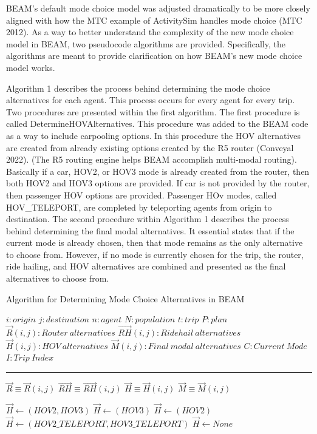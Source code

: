 \documentclass[12pt, oneside, openright]{byuthesis}
\begin{document}
BEAM's default mode choice model was adjusted dramatically to be more closely aligned with how the MTC example of ActivitySim handles mode choice (MTC 2012). As a way to better understand the complexity of the new mode choice model in BEAM, two pseudocode algorithms are provided. Specifically, the algorithms are meant to provide clarification on how BEAM's new mode choice model works.

Algorithm 1 describes the process behind determining the mode choice alternatives for each agent. This process occurs for every agent for every trip. Two procedures are presented within the first algorithm. The first procedure is called DetermineHOVAlternatives. This procedure was added to the BEAM code as a way to include carpooling options. In this procedure the HOV alternatives are created from already existing options created by the R5 router (Conveyal 2022). (The R5 routing engine helps BEAM accomplish multi-modal routing). Basically if a car, HOV2, or HOV3 mode is already created from the router, then both HOV2 and HOV3 options are provided. If car is not provided by the router, then passenger HOV options are provided. Passenger HOv modes, called HOV\_TELEPORT, are completed by teleporting agents from origin to destination. The second procedure within Algorithm 1 describes the process behind determining the final modal alternatives. It essential states that if the current mode is already chosen, then that mode remains as the only alternative to choose from. However, if no mode is currently chosen for the trip, the router, ride hailing, and HOV alternatives are combined and presented as the final alternatives to choose from.

\begin{algorithm} [tph]
\caption{Algorithm for Determining Mode Choice Alternatives in BEAM}
\begin{algorithmic}[1]
\Require
\State $i : origin$
\State $j : destination$
\State $n: agent$
\State $N: population$
\State $t : trip $
\State $P : plan$
\State $\vec{R}(i,j) : Router\: alternatives$
\State $\vec{RH}(i,j) : Ridehail\:alternatives$
\State $\vec{H}(i,j) : HOV\:alternatives$
\State $\vec{M}(i,j) : Final\:modal\:alternatives$
\State $C : Current\:Mode$
\State $I : Trip\:Index$
\vspace{4pt}\hrule\vspace{5pt}

\State $\vec{R} \equiv \vec{R}(i,j)$
\State $\vec{RH} \equiv \vec{RH}(i,j)$
\State $\vec{H} \equiv \vec{H}(i,j)$
\State $\vec{M} \equiv \vec{M}(i,j)$

    \State $\vec{H} \gets (HOV2,HOV3)$
    \State $\vec{H} \gets (HOV3)$
    \State $\vec{H} \gets (HOV2)$
    \State $\vec{H} \gets (HOV2\_TELEPORT, HOV3\_TELEPORT)$
  \EndIf
\Else
  \State $\vec{H} \gets None$
\EndIf
\EndProcedure
\Statex
{}
\end{algorithmic}
\end{algorithm}
\end{document}
